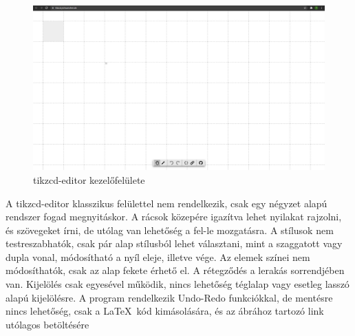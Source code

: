 \begin{figure}[!h]
	\includegraphics[width=\textwidth]{images/tikzcd.png}
	\caption{tikzcd-editor kezelőfelülete \cite{tikzcd}}
	\label{fig:tikzcd}
\end{figure}
A tikzcd-editor klasszikus felülettel nem rendelkezik, csak egy négyzet alapú rendszer fogad megnyitáskor. A rácsok közepére igazítva lehet nyilakat rajzolni, és szövegeket írni, de utólag van lehetőség a fel-le mozgatásra. A stílusok nem testreszabhatók, csak pár alap stílusból lehet választani, mint a szaggatott vagy dupla vonal, módosítható a nyíl eleje, illetve vége. Az elemek színei nem módosíthatók, csak az alap fekete érhető el. A rétegződés a lerakás sorrendjében van. Kijelölés csak egyesével működik, nincs lehetőség téglalap vagy esetleg lasszó alapú kijelölésre. A program rendelkezik Undo-Redo funkciókkal, de mentésre nincs lehetőség, csak a \LaTeX\ kód kimásolására, és az ábrához tartozó link utólagos betöltésére



